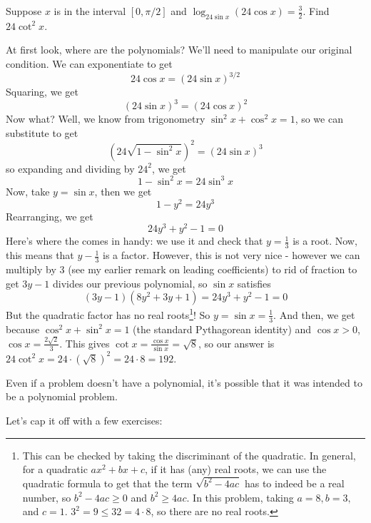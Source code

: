 \documentclass[11pt,titlepage]{scrartcl}
\begin{document}
\begin{example}\label{disc}
Suppose $x$ is in the interval $[0, \pi/2]$ and $\log_{24\sin x} (24\cos x)=\frac{3}{2}$. Find $24\cot^2 x$.
\end{example}
At first look, where are the polynomials? We'll need to manipulate our original condition. We can exponentiate to get
\[24\cos x=(24\sin x)^{3/2}\]
Squaring, we get
\[(24\sin x)^3=(24\cos x)^2\]
Now what? Well, we know from trigonometry $\sin^2x+\cos^2x=1$, so we can substitute to get
\[(24\sqrt{1-\sin^2x})^2=(24\sin x)^3\]
so expanding and dividing by $24^2$, we get
\[1-\sin^2x=24\sin^3 x\]
Now, take $y=\sin x$, then we get
\[1-y^2=24y^3\]
Rearranging, we get
\[24y^3+y^2-1=0\]
Here's where the  comes in handy: we use it and check that $y=\tfrac 13$ is a root. Now, this means that $y-\tfrac 13$ is a factor. However, this is not very nice - however we can multiply by $3$ (see my earlier remark on leading coefficients) to rid of fraction to get $3y-1$ divides our previous polynomial, so $\sin x$ satisfies
\[(3y-1)(8y^2+3y+1)=24y^3+y^2-1=0\]
But the quadratic factor has no real roots\footnote{This can be checked by taking the discriminant of the quadratic. In general, for a quadratic $ax^2+bx+c$, if it has (any) real roots, we can use the quadratic formula to get that the term $\sqrt{b^2-4ac}$ has to indeed be a real number, so $b^2-4ac\geq 0$ and $b^2\geq 4ac$. In this problem, taking $a=8,b=3,$ and $c=1$. $3^2=9\leq 32=4\cdot 8$, so there are no real roots.}! So $y=\sin x=\tfrac 13$. And then, we get because $\cos^2x+\sin^2x=1$ (the standard Pythagorean identity) and $\cos x>0$, $\cos x=\tfrac{2\sqrt{2}}{3}$. This gives $\cot x=\tfrac{\cos x}{\sin x}=\sqrt 8$, so our answer is $24\cot^2x=24\cdot \left(\sqrt8\right)^2=24\cdot 8=\boxed{192}$.
\begin{remark}
Even if a problem doesn't have a polynomial, it's possible that it was intended to be a polynomial problem.
\end{remark}
Let's cap it off with a few exercises:
\end{document}
